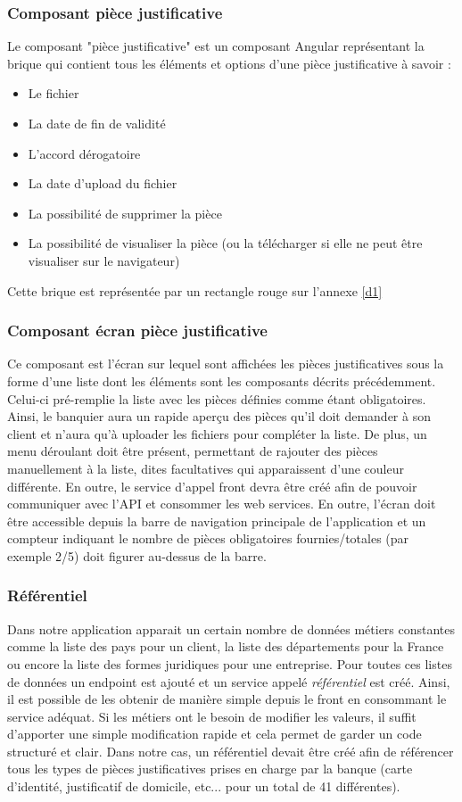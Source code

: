 	\subsubsection{Composant pièce justificative}
	Le composant "pièce justificative" est un composant Angular représentant la brique qui contient tous les éléments et options d'une pièce justificative à savoir :
	\begin{itemize}
		\item Le fichier
		\item La date de fin de validité
		\item L'accord dérogatoire
		\item La date d'upload du fichier
		\item La possibilité de supprimer la pièce
		\item La possibilité de visualiser la pièce (ou la télécharger si elle ne peut être visualiser sur le navigateur)
	\end{itemize}
	Cette brique est représentée par un rectangle rouge sur l'annexe \ref{d1}
	
	\subsubsection{Composant écran pièce justificative}
	Ce composant est l'écran sur lequel sont affichées les pièces justificatives sous la forme d'une liste dont les éléments sont les composants décrits précédemment. Celui-ci pré-remplie la liste avec les pièces définies comme étant obligatoires. Ainsi, le banquier aura un rapide aperçu des pièces qu'il doit demander à son client et n'aura qu'à uploader les fichiers pour compléter la liste. De plus, un menu déroulant doit être présent, permettant de rajouter des pièces manuellement à la liste, dites facultatives qui apparaissent d'une couleur différente. En outre, le service d'appel front devra être créé afin de pouvoir communiquer avec l'API et consommer les web services. En outre, l'écran doit être accessible depuis la barre de navigation principale de l'application et un compteur indiquant le nombre de pièces obligatoires fournies/totales (par exemple 2/5) doit figurer au-dessus de la barre.
	
	\subsubsection{Référentiel}
	Dans notre application apparait un certain nombre de données métiers constantes comme la liste des pays pour un client, la liste des départements pour la France ou encore la liste des formes juridiques pour une entreprise. Pour toutes ces listes de données un endpoint est ajouté et un service appelé \textit{référentiel} est créé. Ainsi, il est possible de les obtenir de manière simple depuis le front en consommant le service adéquat. Si les métiers ont le besoin de modifier les valeurs, il suffit d'apporter une simple modification rapide et cela permet de garder un code structuré et clair. Dans notre cas, un référentiel devait être créé afin de référencer tous les types de pièces justificatives prises en charge par la banque (carte d'identité, justificatif de domicile, etc... pour un total de 41 différentes).	
	
